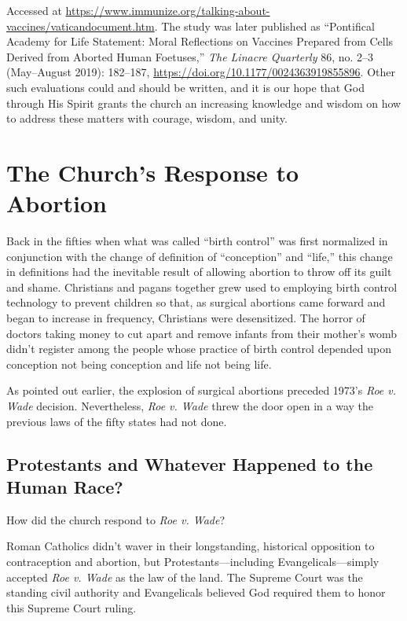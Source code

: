 \documentclass[
]{book}
\begin{document}
{  Accessed at \url{https://www.immunize.org/talking-about-vaccines/vaticandocument.htm}. The study was later published as ``Pontifical Academy for Life Statement: Moral Reflections on Vaccines Prepared from Cells Derived from Aborted Human Foetuses,'' \emph{The Linacre Quarterly} 86, no. 2--3 (May--August 2019): 182--187, \url{https://doi.org/10.1177/0024363919855896}.} Other such evaluations could and should be written, and it is our hope that God through His Spirit grants the church an increasing knowledge and wisdom on how to address these matters with courage, wisdom, and unity.

\hypertarget{the-churchs-response-to-abortion}{%
\section{The Church's Response to Abortion}\label{the-churchs-response-to-abortion}}

Back in the fifties when what was called ``birth control'' was first normalized in conjunction with the change of definition of ``conception'' and ``life,'' this change in definitions had the inevitable result of allowing abortion to throw off its guilt and shame. Christians and pagans together grew used to employing birth control technology to prevent children so that, as surgical abortions came forward and began to increase in frequency, Christians were desensitized. The horror of doctors taking money to cut apart and remove infants from their mother's womb didn't register among the people whose practice of birth control depended upon conception not being conception and life not being life.

As pointed out earlier, the explosion of surgical abortions preceded 1973's \emph{Roe v. Wade} decision. Nevertheless, \emph{Roe v. Wade} threw the door open in a way the previous laws of the fifty states had not done.

\hypertarget{protestants-and-whatever-happened-to-the-human-race}{%
\subsection{Protestants and Whatever Happened to the Human Race?}\label{protestants-and-whatever-happened-to-the-human-race}}

How did the church respond to \emph{Roe v. Wade}?

Roman Catholics didn't waver in their longstanding, historical opposition to contraception and abortion, but Protestants---including Evangelicals---simply accepted \emph{Roe v. Wade} as the law of the land. The Supreme Court was the standing civil authority and Evangelicals believed God required them to honor this Supreme Court ruling.
\end{document}

